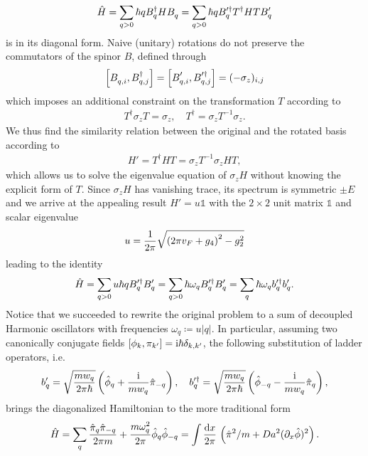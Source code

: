 \begin{align}
    \hat H = \sum_{q>0}\hbar qB^\dag_q H B^\pdag_q = \sum_{q>0}\hbar qB'^\dag_q T^\dag H T B'^\pdag_q
\end{align}
is in its diagonal form.
Naive (unitary) rotations do not preserve the commutators of the spinor $B$, defined through
\begin{align}
    \commutator{B_{q,i}^\pdag,B^\dag_{q,j}} = \commutator{B_{q,i}'^\pdag,B'^\dag_{q,j}} = (-\sigma_z)_{i,j}
\end{align}
which imposes an additional constraint on the transformation $T$ according to
\begin{align}
    T^\dag\sigma_z T = \sigma_z,
    \quad
    T^\dag = \sigma_zT^{-1}\sigma_z.
\end{align}
We thus find the similarity relation between the original and the rotated basis according to
\begin{align}
    H'=T^\dag HT =\sigma_z T^{-1}\sigma_z H T,
\end{align}
which allows us to solve the eigenvalue equation of $\sigma_z H$ without knowing the explicit form of $T$.
Since $\sigma_zH$ has vanishing trace, its spectrum is symmetric $\pm E$ and we arrive at the appealing result $H' = u\mathbb1$ with the $2\times2$ unit matrix $\mathbb1$ and scalar eigenvalue
\begin{align}
    u = \frac1{2\pi}\sqrt{\left( 2\pi v_F + g_4 \right)^2 - g_2^2}
\end{align}
leading to the identity
\begin{align}
    \hat H = \sum_{q>0} u\hbar q B'^\dag_q B'^\pdag_q = \sum_{q>0} \hbar \omega_q B'^\dag_q B'^\pdag_q = \sum_q \hbar  \omega_q b'^\dag_qb'^\pdag_q.
\end{align}
Notice that we succeeded to rewrite the original problem to a sum of decoupled Harmonic oscillators with frequencies $\omega_q\coloneqq u|q|$.
In particular, assuming two canonically conjugate fields $\left[ \phi_{k},\pi_{k'} \right] = \mathrm i\hbar\delta_{k,k'}$, the following substitution of ladder operators, i.e.
\begin{align}
    b'_q = \sqrt{\frac{mw_q}{2\pi\hbar}}\left( \hat\phi_q + \frac{\mathrm i}{mw_q}\hat\pi_{-q} \right),
    \quad
    b'^\dag_q = \sqrt{\frac{mw_q}{2\pi\hbar}}\left( \hat\phi_{-q} - \frac{\mathrm i}{mw_q}\hat\pi_{q} \right),
\end{align}
brings the diagonalized Hamiltonian to the more traditional form
\begin{align}
    \hat H = \sum_q \frac{\hat\pi_q\hat\pi_{-q}}{2\pi m} + \frac{m\omega_q^2}{2\pi}\hat\phi_q\hat\phi_{-q}
    =
    \int\frac{\mathrm d x}{2\pi}\, \left( \hat\pi^2/m + {Da^2}(\partial_x\hat\phi)^2 \right).
\end{align}
